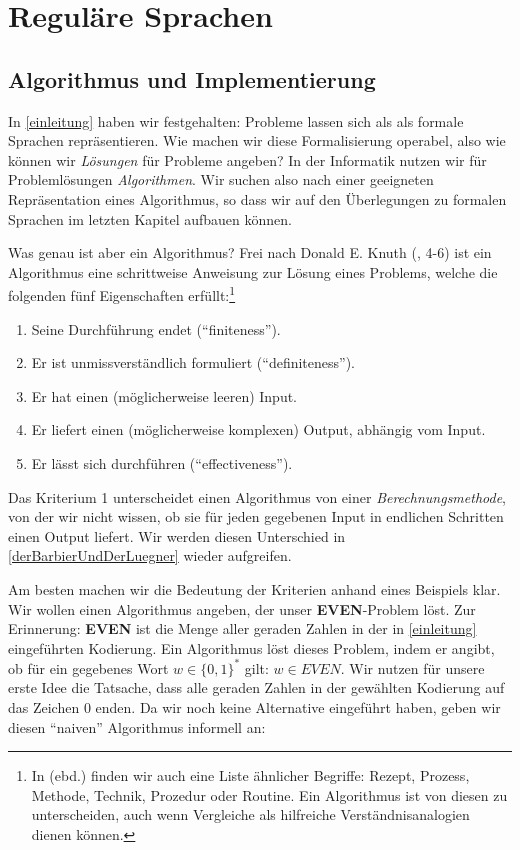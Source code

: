 \chapter{Reguläre Sprachen}

\section{Algorithmus und Implementierung}

In \autoref{einleitung} haben wir festgehalten:
Probleme lassen sich als als formale Sprachen repräsentieren.
Wie machen wir diese Formalisierung operabel,
also wie können wir \emph{Lösungen} für Probleme angeben?
In der Informatik nutzen wir für Problemlösungen \emph{Algorithmen}.
Wir suchen also nach einer geeigneten Repräsentation eines Algorithmus,
so dass wir auf den Überlegungen zu formalen Sprachen im letzten Kapitel aufbauen können.

Was genau ist aber ein Algorithmus?
Frei nach Donald E. Knuth (\cite{knuth1}, 4-6)
ist ein Algorithmus eine schrittweise Anweisung zur Lösung eines Problems,
welche die folgenden fünf Eigenschaften erfüllt:\footnote{
    In \cite{knuth1} (ebd.) finden wir auch eine Liste ähnlicher Begriffe:
    Rezept, Prozess, Methode, Technik, Prozedur oder Routine.
    Ein Algorithmus ist von diesen zu unterscheiden,
    auch wenn Vergleiche als hilfreiche Verständnisanalogien dienen können.
}
\begin{enumerate}
    \item Seine Durchführung endet (``finiteness'').
    \item Er ist unmissverständlich formuliert (``definiteness'').
    \item Er hat einen (möglicherweise leeren) Input.
    \item Er liefert einen (möglicherweise komplexen) Output, abhängig vom Input.
    \item Er lässt sich durchführen (``effectiveness'').
\end{enumerate}

Das Kriterium 1 unterscheidet einen Algorithmus von einer \emph{Berechnungsmethode},
von der wir nicht wissen,
ob sie für jeden gegebenen Input in endlichen Schritten einen Output liefert.
Wir werden diesen Unterschied in \autoref{derBarbierUndDerLuegner} wieder aufgreifen.

Am besten machen wir die Bedeutung der Kriterien anhand eines Beispiels klar.
Wir wollen einen Algorithmus angeben, der unser \textbf{EVEN}-Problem löst.
Zur Erinnerung: \textbf{EVEN} ist die Menge aller geraden Zahlen
in der in \autoref{einleitung} eingeführten Kodierung.
Ein Algorithmus löst dieses Problem,
indem er angibt,
ob für ein gegebenes Wort $w \in \{0,1\}^*$ gilt: $w \in EVEN$.
Wir nutzen für unsere erste Idee die Tatsache,
dass alle geraden Zahlen in der gewählten Kodierung auf das Zeichen 0 enden.
Da wir noch keine Alternative eingeführt haben,
geben wir diesen ``naiven'' Algorithmus informell an:

